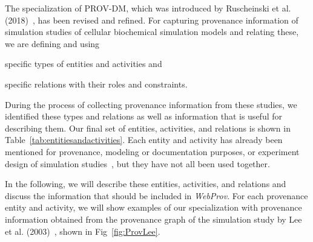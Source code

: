 \documentclass[10pt,letterpaper]{article}
\newcommand{\webprov}{\textit{WebProv}}
\newcommand{\lee}{Lee et al. (2003)}
\begin{document}
The specialization of PROV-DM, which was introduced by Ruscheinski et al. (2018)~\cite{Ruscheinski2018}, has been revised and refined.
For capturing provenance information of simulation studies of cellular biochemical simulation models and relating these, we are defining and using
\begin{inparaenum}[a)]
\item specific types of entities and activities and
\item specific relations with their roles and constraints.
\end{inparaenum}
During the process of collecting provenance information from these studies, we identified these types and relations as well as information that is useful for describing them.
Our final set of entities, activities, and relations is shown in Table~\ref{tab:entitiesandactivities}.
Each entity and activity has already been mentioned for provenance, modeling or documentation purposes, or experiment design of simulation studies~\cite{Ruscheinski2017, Balci2012, Yilmaz2016, Monks2018, Bergmann2014, Carusi2012, Erdemir2012, Lorig2017, Ruscheinski2018, Waltemath2011, Wilsdorf2020b}, but they have not all been used together.

In the following, we will describe these entities, activities, and relations and discuss the information that should be included in \webprov{}.
For each provenance entity and activity, we will show examples of our specialization with provenance information obtained from the provenance graph of the simulation study by \lee{}~\cite{Lee2003}, shown in Fig~\ref{fig:ProvLee}.
\end{document}
